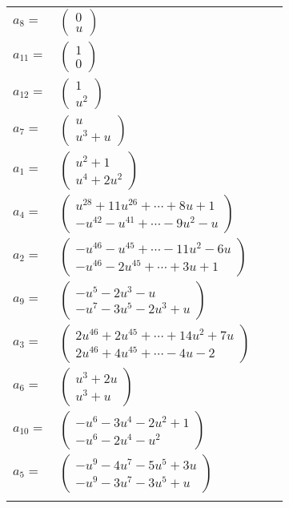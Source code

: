 \documentclass[1p]{elsarticle_modified}
\theoremstyle{definition}
\begin{document}
\begin{tabular}{m{7pt} m{180pt} m{7pt} m{180pt} }
\flushright $a_{8}=$&$\begin{pmatrix}0\\u\end{pmatrix}$ \\
\flushright $a_{11}=$&$\begin{pmatrix}1\\0\end{pmatrix}$ \\
\flushright $a_{12}=$&$\begin{pmatrix}1\\u^2\end{pmatrix}$ \\
\flushright $a_{7}=$&$\begin{pmatrix}u\\u^3+u\end{pmatrix}$ \\
\flushright $a_{1}=$&$\begin{pmatrix}u^2+1\\u^4+2 u^2\end{pmatrix}$ \\
\flushright $a_{4}=$&$\begin{pmatrix}u^{28}+11 u^{26}+\cdots+8 u+1\\- u^{42}- u^{41}+\cdots-9 u^2- u\end{pmatrix}$ \\
\flushright $a_{2}=$&$\begin{pmatrix}- u^{46}- u^{45}+\cdots-11 u^2-6 u\\- u^{46}-2 u^{45}+\cdots+3 u+1\end{pmatrix}$ \\
\flushright $a_{9}=$&$\begin{pmatrix}- u^5-2 u^3- u\\- u^7-3 u^5-2 u^3+u\end{pmatrix}$ \\
\flushright $a_{3}=$&$\begin{pmatrix}2 u^{46}+2 u^{45}+\cdots+14 u^2+7 u\\2 u^{46}+4 u^{45}+\cdots-4 u-2\end{pmatrix}$ \\
\flushright $a_{6}=$&$\begin{pmatrix}u^3+2 u\\u^3+u\end{pmatrix}$ \\
\flushright $a_{10}=$&$\begin{pmatrix}- u^6-3 u^4-2 u^2+1\\- u^6-2 u^4- u^2\end{pmatrix}$ \\
\flushright $a_{5}=$&$\begin{pmatrix}- u^9-4 u^7-5 u^5+3 u\\- u^9-3 u^7-3 u^5+u\end{pmatrix}$\\&\end{tabular}
\end{document}
